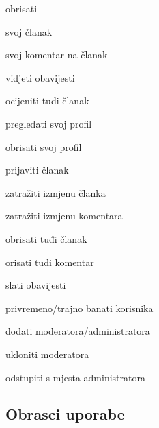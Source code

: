 \begin{packed_enum}
\begin{packed_enum}
    \item obrisati

        \begin{packed_enum}

        \item svoj članak
        \item svoj komentar na članak

        \end{packed_enum}

    \item vidjeti obavijesti
    \item ocijeniti tuđi članak
    \item pregledati svoj profil
    \item obrisati svoj profil
    \item prijaviti članak

    \end{packed_enum}

\item {}

    \begin{packed_enum}

    \item zatražiti izmjenu članka
    \item zatražiti izmjenu komentara
    \item obrisati tuđi članak
    \item orisati tuđi komentar
    \item slati obavijesti
    \item privremeno/trajno banati korisnika

    \end{packed_enum}

\item {}

    \begin{packed_enum}

    \item dodati moderatora/administratora
    \item ukloniti moderatora
    \item odstupiti s mjesta administratora

    \end{packed_enum}

\end{packed_enum}

\eject 

\subsection{Obrasci uporabe}


